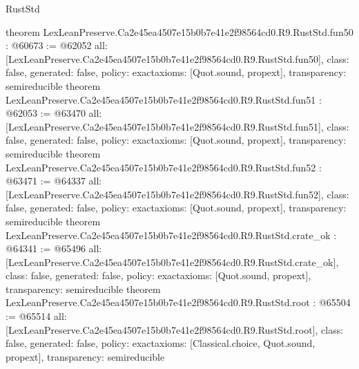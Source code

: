 \begin{lexlean}{RustStd}
\begin{coremodule}
{}
theorem LexLeanPreserve.Ca2e45ea4507e15b0b7e41e2f98564cd0.R9.RustStd.fun50 : @60673 := @62052 {
  all: [LexLeanPreserve.Ca2e45ea4507e15b0b7e41e2f98564cd0.R9.RustStd.fun50],
  class: false,
  generated: false,
  policy: exact{axioms: [Quot.sound, propext]},
  transparency: semireducible
}
theorem LexLeanPreserve.Ca2e45ea4507e15b0b7e41e2f98564cd0.R9.RustStd.fun51 : @62053 := @63470 {
  all: [LexLeanPreserve.Ca2e45ea4507e15b0b7e41e2f98564cd0.R9.RustStd.fun51],
  class: false,
  generated: false,
  policy: exact{axioms: [Quot.sound, propext]},
  transparency: semireducible
}
theorem LexLeanPreserve.Ca2e45ea4507e15b0b7e41e2f98564cd0.R9.RustStd.fun52 : @63471 := @64337 {
  all: [LexLeanPreserve.Ca2e45ea4507e15b0b7e41e2f98564cd0.R9.RustStd.fun52],
  class: false,
  generated: false,
  policy: exact{axioms: [Quot.sound, propext]},
  transparency: semireducible
}
theorem LexLeanPreserve.Ca2e45ea4507e15b0b7e41e2f98564cd0.R9.RustStd.crate_ok : @64341 := @65496 {
  all: [LexLeanPreserve.Ca2e45ea4507e15b0b7e41e2f98564cd0.R9.RustStd.crate_ok],
  class: false,
  generated: false,
  policy: exact{axioms: [Quot.sound, propext]},
  transparency: semireducible
}
theorem LexLeanPreserve.Ca2e45ea4507e15b0b7e41e2f98564cd0.R9.RustStd.root : @65504 := @65514 {
  all: [LexLeanPreserve.Ca2e45ea4507e15b0b7e41e2f98564cd0.R9.RustStd.root],
  class: false,
  generated: false,
  policy: exact{axioms: [Classical.choice, Quot.sound, propext]},
  transparency: semireducible
}


\end{coremodule}
\end{lexlean}
